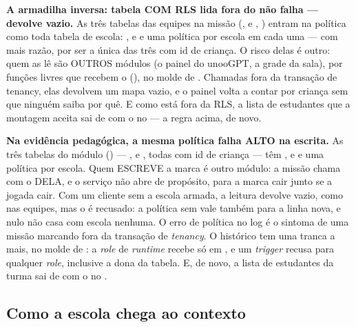 \begin{atencao}
\textbf{A armadilha inversa: tabela COM RLS lida fora do  não
falha --- devolve vazio.} As três tabelas das equipes na missão
(,  e ,
) entram na política como toda tabela de escola:
,  e  e uma
política por escola em cada uma ---  com mais razão, por ser
a única das três com id de criança. O risco delas é outro: quem as lê são OUTROS
módulos (o painel do unooGPT, a grade da sala), por funções
livres que recebem o  (), no molde de
. Chamadas fora da transação de tenancy, elas devolvem um
mapa vazio, e o painel volta a contar por criança sem que ninguém saiba por quê.
E como  está fora da RLS, a lista de estudantes que a montagem aceita
sai de  com o  no  --- a regra acima,
de novo.
\end{atencao}

\begin{atencao}
\textbf{Na evidência pedagógica, a mesma política falha ALTO na escrita.} As
três tabelas do módulo  () ---
,  e , todas com
id de criança --- têm ,  e  e uma política por escola. Quem ESCREVE a marca é outro módulo: a
missão chama  com o  DELA, e o serviço não
abre  de propósito, para a marca cair junto se a jogada cair. Com
um cliente sem a escola armada, a leitura devolve vazio, como nas equipes, mas o
 é recusado: a política sem  vale também para a linha
nova, e  nulo não casa com escola
nenhuma. O erro de política no log é o sintoma de uma missão marcando fora da
transação de \emph{tenancy}. O histórico tem uma tranca a mais, no molde de
: a \emph{role} de \emph{runtime} recebe só
 em , e um \emph{trigger} recusa
 para qualquer \emph{role}, inclusive a dona da tabela. E, de novo, a
lista de estudantes da turma sai de  com o  no
.
\end{atencao}

\subsection{Como a escola chega ao contexto}


